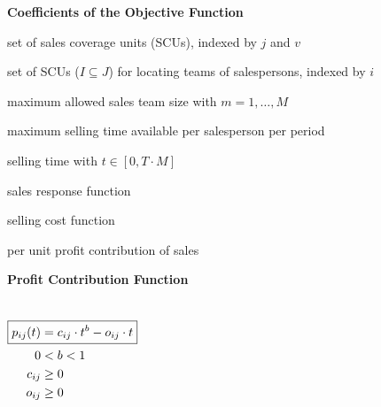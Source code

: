 \documentclass[xcolor=dvipsnames,aspectratio=169, handout, mathserif]{beamer}
\begin{document}
\begin{frame}{\textbf{Coefficients of the Objective Function}}
\begin{description}
	\item[$J$]       set of sales coverage units (SCUs), indexed by $j$ and $v$
  \item[$I$]       set of SCUs ($I \subseteq J$) for locating teams of salespersons, indexed by $i$
  \item[$M$] maximum allowed sales team size with $m = 1,\dots,M$
  \item[$T$] maximum selling time available per salesperson per period
  \item[$t$]       selling time with $t \in \left[0,T \cdot M\right]$									
  \item<2->[$s_{ij}(t)$]  sales response function
  \item<2->[$k_{ij}(t)$]  selling cost function
	\item<2->[$\alpha$] per unit profit contribution of sales
\end{description}
\vfill
{}
\end{frame}





\begin{frame}{\textbf{Profit Contribution Function}}
\begin{columns}
\centering
\begin{align*}
\Aboxed{p_{ij}(t) &= c_{ij} \cdot t^b - o_{ij} \cdot t}\\
0 &< b < 1 \\
c_{ij} &\geq 0 \\
o_{ij} &\geq 0 \\
\end{align*}
\begin{figure}[h!]
	\centering
\scalebox{1.5}{

}
	\label{fig:ProfitContri_Elast}
\end{figure}
\end{columns}
\end{frame}
\end{document}
